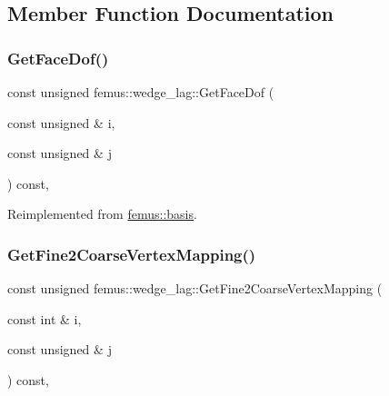 \subsection{Member Function Documentation}
\mbox{\label{classfemus_1_1wedge__lag_a3c027b9b1360d01725004434e89b671d}} 
\subsubsection{\texorpdfstring{Get\+Face\+Dof()}{GetFaceDof()}}
{\footnotesize\ttfamily const unsigned femus\+::wedge\+\_\+lag\+::\+Get\+Face\+Dof (\begin{DoxyParamCaption}\item[{const unsigned \&}]{i,  }\item[{const unsigned \&}]{j }\end{DoxyParamCaption}) const\hspace{0.3cm}{\ttfamily [inline]}, {\ttfamily [virtual]}}



Reimplemented from \mbox{\hyperlink{classfemus_1_1basis_a06f93864b6ce0925d41bf08173dc2500}{femus\+::basis}}.

\mbox{\label{classfemus_1_1wedge__lag_a2e69a8ef73eaecbf5b5abf5db49c3dec}} 
\subsubsection{\texorpdfstring{Get\+Fine2\+Coarse\+Vertex\+Mapping()}{GetFine2CoarseVertexMapping()}}
{\footnotesize\ttfamily const unsigned femus\+::wedge\+\_\+lag\+::\+Get\+Fine2\+Coarse\+Vertex\+Mapping (\begin{DoxyParamCaption}\item[{const int \&}]{i,  }\item[{const unsigned \&}]{j }\end{DoxyParamCaption}) const\hspace{0.3cm}{\ttfamily [inline]}, {\ttfamily [virtual]}}



